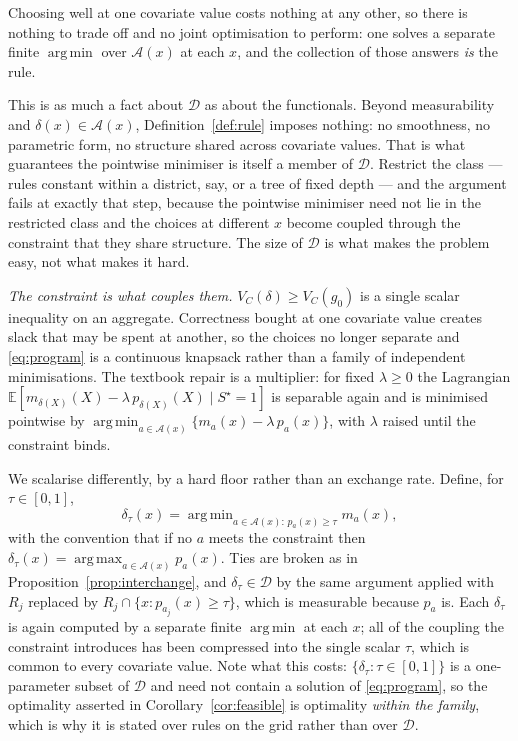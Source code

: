 \documentclass[11pt,a4paper]{article}
\theoremstyle{plain}
\theoremstyle{definition}
\theoremstyle{remark}
\DeclareMathOperator*{\argmin}{arg\,min}
\DeclareMathOperator*{\argmax}{arg\,max}
\newcommand{\E}{\mathbb E}
\newcommand{\Sstar}{S^{\star}}
\begin{document}
Choosing well at one covariate value costs nothing at any other, so there is nothing to trade off
and no joint optimisation to perform: one solves a separate finite $\argmin$ over $\mathcal A(x)$
at each $x$, and the collection of those answers \emph{is} the rule.

This is as much a fact about $\mathcal D$ as about the functionals. Beyond measurability and
$\delta(x)\in\mathcal A(x)$, Definition~\ref{def:rule} imposes nothing: no smoothness, no
parametric form, no structure shared across covariate values. That is what guarantees the
pointwise minimiser is itself a member of $\mathcal D$. Restrict the class --- rules constant
within a district, say, or a tree of fixed depth --- and the argument fails at exactly that
step, because
the pointwise minimiser need not lie in the restricted class and the choices at different $x$
become coupled through the constraint that they share structure. The size of $\mathcal D$ is
what makes the problem easy, not what makes it hard.

\emph{The constraint is what couples them.} $V_C(\delta)\ge V_C(g_0)$ is a
single scalar inequality on an aggregate. Correctness bought at one covariate value creates
slack that may be spent at another, so the choices no longer separate and \eqref{eq:program} is
a continuous knapsack rather than a family of independent minimisations. The textbook repair is
a multiplier: for fixed $\lambda\ge0$ the Lagrangian
$\E[m_{\delta(X)}(X)-\lambda\,p_{\delta(X)}(X)\mid \Sstar=1]$ is separable again and is minimised
pointwise by $\argmin_{a\in\mathcal A(x)}\{m_a(x)-\lambda\,p_a(x)\}$, with $\lambda$ raised
until the constraint binds.

We scalarise differently, by a hard floor rather than an exchange rate. Define, for
$\tau\in[0,1]$,
\begin{equation}
\delta_\tau(x)=\argmin_{a\in\mathcal A(x):\,p_a(x)\ge\tau}m_a(x),
\label{eq:pointwise}
\end{equation}
with the convention that if no $a$ meets the constraint then
$\delta_\tau(x)=\argmax_{a\in\mathcal A(x)}p_a(x)$. Ties are broken as in
Proposition~\ref{prop:interchange}, and $\delta_\tau\in\mathcal D$ by the same argument applied
with $R_j$ replaced by $R_j\cap\{x:p_{a_j}(x)\ge\tau\}$, which is measurable because $p_a$ is.
Each $\delta_\tau$ is again computed by a separate finite $\argmin$ at each $x$; all of the
coupling the constraint introduces has been compressed into the single scalar $\tau$, which is
common to every covariate value. Note what
this costs: $\{\delta_\tau:\tau\in[0,1]\}$ is a one-parameter subset of $\mathcal D$ and need not
contain a solution of \eqref{eq:program}, so the optimality asserted in
Corollary~\ref{cor:feasible} is optimality \emph{within the family}, which is why it is stated
over rules on the grid rather than over $\mathcal D$.
\end{document}
